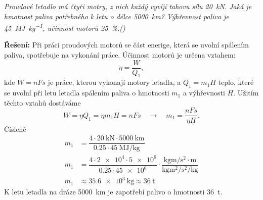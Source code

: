\begin{mdframed}[style=mdexam]
  \begin{example}\label{FYZ:exam028}
    \emph{Proudové letadlo má čtyři motry, z nich každý vyvíjí tahovu sílu \SI{20}{\kN}. Jaká je
    hmotnost paliva potřebného k letu o délce \SI{5000}{\km}? Výhřevnost paliva je
    \SI{45}{\mega\joule\per\kg}, učinnost motorů \SI{25}{\percent}.(\cite[s.~32]{Bartuska1997})}  

    {\centering
    \captionsetup{type=figure}
    \par} 
    
    \textbf{Řešení:}\newline 
    Při práci proudových motorů se část enerige, která se uvolní spálením paliva, spotřebuje na
    vykonání práce. Účinnost motorů je určena vztahem:
    \begin{equation*}
      \eta = \dfrac{W}{Q_1},
    \end{equation*}
    kde \(W = nFs\) je práce, kterou vykonají motory letadla, a \(Q_1 = m_1H\) teplo, které se
    uvolní při letu letadla spálením paliva o hmotnosti \(m_1\) a výhřevnosti \(H\). Užitím těchto
    vztahů dostáváme
    \begin{equation*}
     W = \eta Q_1 = \eta m_1H = nFs \quad\rightarrow\quad m_1 = \dfrac{nFs}{\eta H}.
    \end{equation*}
    Čísleně 
    \begin{align*}
       m_1 &= \dfrac{4\cdot\SI{20}{\kN}\cdot\SI{5000}{\km}}
                    {\num{0.25}\cdot\SI{45}{\mega\joule\per\kg}}                                  \\
       m_1 &= \dfrac{4\cdot\num{2e4}\cdot\num{5e6}}{\num{0.25}\cdot\num{45e6}}\cdot
              \dfrac{\si{\kg\m\per\square\s}\cdot\si{\m}}{\si{\kg\square\m\per\square\s\per\kg}}  \\
       m_1 &\approx \SI{35.6e3}{\kg} \approx \SI{36}{\tonne}        
     \end{align*}
     K letu letadla na dráze \SI{5000}{\km} je zapotřebí palivo o hmotnosti \SI{36}{\tonne}.
  \end{example} 
\end{mdframed}
